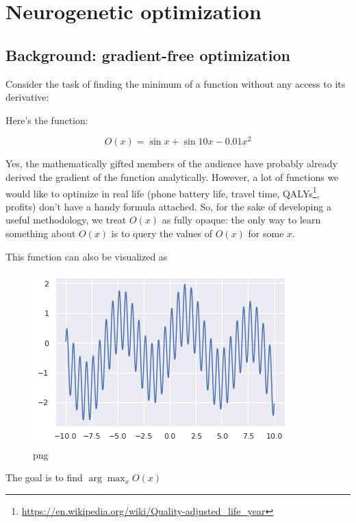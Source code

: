 \section{Neurogenetic optimization}

\subsection{Background: gradient-free optimization}

Consider the task of finding the minimum of a function without any access to its derivative:

Here's the function:

\begin{equation}
O(x) = \sin x + \sin 10x - 0.01x^2
\end{equation}

Yes, the mathematically gifted members of the audience have probably already derived the gradient of the function analytically. However, a lot of functions we would like to optimize in real life (phone battery life, travel time, QALYs\footnote{\url{https://en.wikipedia.org/wiki/Quality-adjusted_life_year}}, profits) don't have a handy formula attached. So, for the sake of developing a useful methodology, we treat $ O(x) $ as fully opaque: the only way to learn something about $ O(x) $ is to query the values of $ O(x) $ for some $x$.
    
This function can also be visualized as

    
\begin{figure}
    \centering
    \includegraphics[width=0.8\linewidth]{images/neuropt1.png}
    \caption{png}
\end{figure}

    


The goal is to find $ \arg\max_x O(x) $

